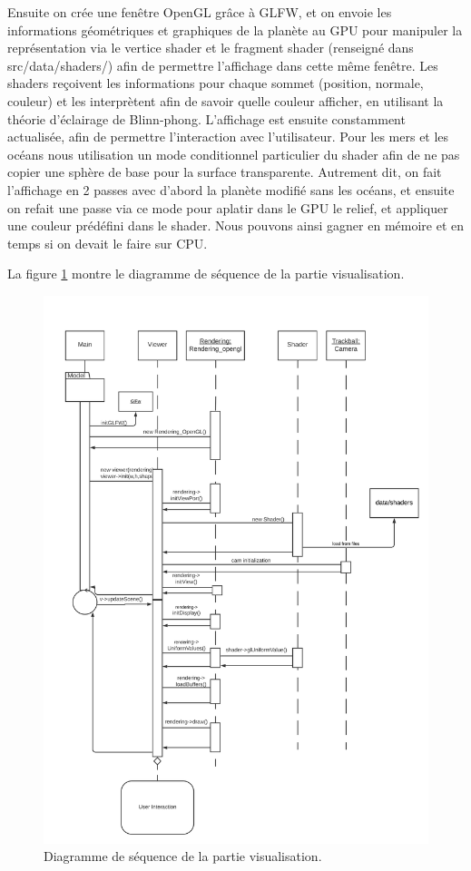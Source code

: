 \documentclass[a4paper]{article}
\begin{document}
Ensuite on crée une fenêtre OpenGL grâce à GLFW, et on envoie les informations géométriques et graphiques de la planète au GPU pour manipuler la représentation via le vertice shader et le fragment shader (renseigné dans src/data/shaders/) afin de permettre l'affichage dans cette même fenêtre. Les shaders reçoivent les informations pour chaque sommet (position, normale, couleur) et les interprètent afin de savoir quelle couleur afficher, en utilisant la théorie d'éclairage de Blinn-phong. L'affichage est ensuite constamment actualisée, afin de permettre l'interaction avec l'utilisateur.
Pour les mers et les océans nous utilisation un mode conditionnel particulier du shader afin de ne pas copier une sphère de base pour la surface transparente. Autrement dit, on fait l'affichage en 2 passes avec d'abord la planète modifié sans les océans, et ensuite on refait une passe via ce mode pour aplatir dans le GPU le relief, et appliquer une couleur prédéfini dans le shader. Nous pouvons ainsi gagner en mémoire et en temps si on devait le faire sur CPU.

La figure \ref{seqvisu} montre le diagramme de séquence de la partie visualisation.

\begin{figure}[!h]
    \begin{center}
        \includegraphics[width=0.7\linewidth]{img/visu_seq.png} 
        \caption{Diagramme de séquence de la partie visualisation.}
        \label{seqvisu}
    \end{center}
\end{figure}
\end{document}
